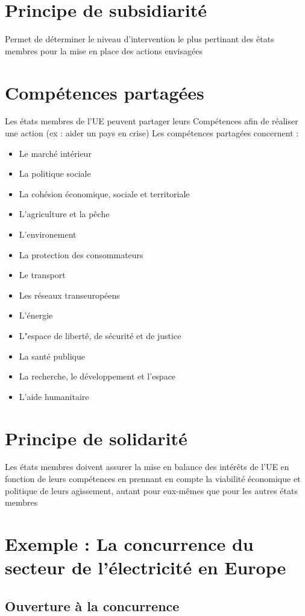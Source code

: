 \section{Principe de subsidiarité}
Permet de déterminer le niveau d'intervention le plus pertinant des états membres pour la mise en place des actions envisagées
\newline
\section{Compétences partagées}
Les états membres de l'UE peuvent partager leurs Compétences afin de réaliser une action (ex : aider un pays en crise) \newline
Les compétences partagées concernent :
\begin{itemize}
    \item Le marché intérieur
    \item La politique sociale
    \item La cohésion économique, sociale et territoriale
    \item L'agriculture et la pêche
    \item L'environement
    \item La protection des consommateurs
    \item Le transport
    \item Les réseaux transeuropéens
    \item L'énergie
    \item L"espace de liberté, de sécurité et de justice
    \item La santé publique
    \item La recherche, le développement et l'espace
    \item L'aide humanitaire \newline
\end{itemize}
\newpage
\section{Principe de solidarité}
Les états membres doivent assurer la mise en balance des intérêts de l'UE en fonction de leurs compétences en prennant en compte la viabilité économique et politique de leurs agissement, autant pour eux-mêmes que pour les autres états membres
\section{Exemple : La concurrence du secteur de l'électricité en Europe}
\subsection{Ouverture à la concurrence}

